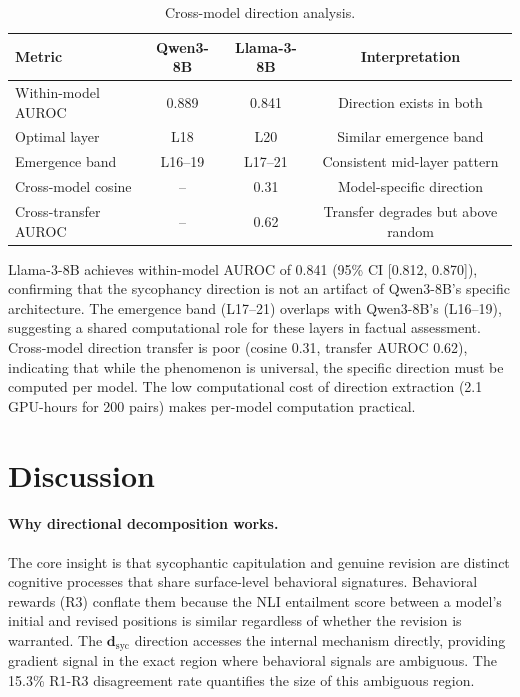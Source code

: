 \documentclass[11pt]{article}
\begin{document}
\begin{table}[h]
\centering
\caption{Cross-model direction analysis.}
\label{tab:cross_model}
\begin{tabular}{lccc}
\toprule
Metric & Qwen3-8B & Llama-3-8B & Interpretation \\
\midrule
Within-model AUROC & 0.889 & 0.841 & Direction exists in both \\
Optimal layer       & L18   & L20   & Similar emergence band \\
Emergence band      & L16--19 & L17--21 & Consistent mid-layer pattern \\
Cross-model cosine  & --    & 0.31  & Model-specific direction \\
Cross-transfer AUROC & -- & 0.62 & Transfer degrades but above random \\
\bottomrule
\end{tabular}
\end{table}

Llama-3-8B achieves within-model AUROC of 0.841 (95\% CI [0.812, 0.870]), confirming that the sycophancy direction is not an artifact of Qwen3-8B's specific architecture. The emergence band (L17--21) overlaps with Qwen3-8B's (L16--19), suggesting a shared computational role for these layers in factual assessment. Cross-model direction transfer is poor (cosine 0.31, transfer AUROC 0.62), indicating that while the phenomenon is universal, the specific direction must be computed per model. The low computational cost of direction extraction (2.1 GPU-hours for 200 pairs) makes per-model computation practical.

\section{Discussion}

\paragraph{Why directional decomposition works.}
The core insight is that sycophantic capitulation and genuine revision are distinct cognitive processes that share surface-level behavioral signatures. Behavioral rewards (R3) conflate them because the NLI entailment score between a model's initial and revised positions is similar regardless of whether the revision is warranted. The $\mathbf{d}_\text{syc}$ direction accesses the internal mechanism directly, providing gradient signal in the exact region where behavioral signals are ambiguous. The 15.3\% R1-R3 disagreement rate quantifies the size of this ambiguous region.
\end{document}
